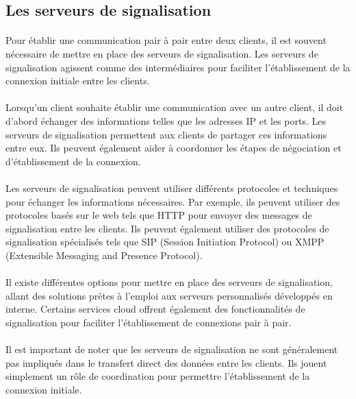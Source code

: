 \subsection{Les serveurs de signalisation}

\paragraph{}
Pour établir une communication pair à pair entre deux clients, il est souvent nécessaire de mettre en place des serveurs de signalisation. Les serveurs de signalisation agissent comme des intermédiaires pour faciliter 
l'établissement de la connexion initiale entre les clients.

\paragraph{}
Lorsqu'un client souhaite établir une communication avec un autre client, il doit d'abord échanger des informations telles que les adresses IP et les ports. Les serveurs de signalisation permettent aux clients de partager ces 
informations entre eux. Ils peuvent également aider à coordonner les étapes de négociation et d'établissement de la connexion.

\paragraph{}
Les serveurs de signalisation peuvent utiliser différents protocoles et techniques pour échanger les informations nécessaires. Par exemple, ils peuvent utiliser des protocoles basés sur le web tels que HTTP pour envoyer des messages 
de signalisation entre les clients. Ils peuvent également utiliser des protocoles de signalisation spécialisés tels que SIP (Session Initiation Protocol) ou XMPP (Extensible Messaging and Presence Protocol).

\paragraph{}
Il existe différentes options pour mettre en place des serveurs de signalisation, allant des solutions prêtes à l'emploi aux serveurs personnalisés développés en interne. Certains services cloud offrent également des 
fonctionnalités de signalisation pour faciliter l'établissement de connexions pair à pair.

\paragraph{}
Il est important de noter que les serveurs de signalisation ne sont généralement pas impliqués dans le transfert direct des données entre les clients. Ils jouent simplement un rôle de coordination pour permettre 
l'établissement de la connexion initiale.


